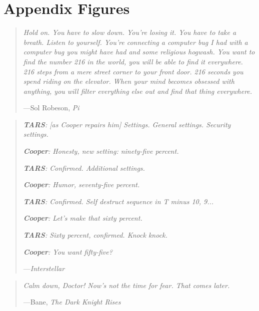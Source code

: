 \chapter{Appendix Figures}

\begin{quote}
  \emph{Hold on. You have to slow down. You're losing it. You have to take a breath. Listen to yourself. You're connecting a computer bug I had with a computer bug you might have had and some religious hogwash. You want to find the number 216 in the world, you will be able to find it everywhere. 216 steps from a mere street corner to your front door. 216 seconds you spend riding on the elevator. When your mind becomes obsessed with anything, you will filter everything else out and find that thing everywhere.}
  
  \begin{flushright}
    —Sol Robeson, \emph{Pi}
  \end{flushright}
\end{quote}

\vspace{1em}

\begin{quote}
  \emph{\textbf{TARS}: [as Cooper repairs him] Settings. General settings. Security settings.}
  
  \emph{\textbf{Cooper}: Honesty, new setting: ninety-five percent.}
  
  \emph{\textbf{TARS}: Confirmed. Additional settings.}
  
  \emph{\textbf{Cooper}: Humor, seventy-five percent.}
  
  \emph{\textbf{TARS}: Confirmed. Self destruct sequence in T minus 10, 9...}
  
  \emph{\textbf{Cooper}: Let's make that sixty percent.}
  
  \emph{\textbf{TARS}: Sixty percent, confirmed. Knock knock.}
  
  \emph{\textbf{Cooper}: You want fifty-five?}
  
  \begin{flushright}
    —\emph{Interstellar}
  \end{flushright}
\end{quote}

\vspace{1em}

\begin{quote}
  \emph{Calm down, Doctor! Now's not the time for fear. That comes later.}
  
  \begin{flushright}
    —Bane, \emph{The Dark Knight Rises}
  \end{flushright}
\end{quote}

